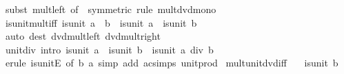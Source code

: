 \begin{isabellebody}
\ {\isacharparenleft}{\kern0pt}subst\ mult{\isacharunderscore}{\kern0pt}{}{\isacharunderscore}{\kern0pt}left\ {\isacharbrackleft}{\kern0pt}of\ {}{\isacharcomma}{\kern0pt}\ symmetric{\isacharbrackright}{\kern0pt}{\isacharparenright}{\kern0pt}\ {\isacharparenleft}{\kern0pt}rule\ mult{\isacharunderscore}{\kern0pt}dvd{\isacharunderscore}{\kern0pt}mono{\isacharparenright}{\kern0pt}%
\endisatagproof
{\isafoldproof}%
%
\isadelimproof
\isanewline
%
\endisadelimproof
\isanewline
{}\isamarkupfalse%
\ is{\isacharunderscore}{\kern0pt}unit{\isacharunderscore}{\kern0pt}mult{\isacharunderscore}{\kern0pt}iff{\isacharcolon}{\kern0pt}\ {\isachardoublequoteopen}is{\isacharunderscore}{\kern0pt}unit\ {\isacharparenleft}{\kern0pt}a\ {\isacharasterisk}{\kern0pt}\ b{\isacharparenright}{\kern0pt}\ {\isasymlongleftrightarrow}\ is{\isacharunderscore}{\kern0pt}unit\ a\ {\isasymand}\ is{\isacharunderscore}{\kern0pt}unit\ b{\isachardoublequoteclose}\isanewline
%
\isadelimproof
\ \ %
\endisadelimproof
%
\isatagproof
{}\isamarkupfalse%
\ {\isacharparenleft}{\kern0pt}auto\ dest{\isacharcolon}{\kern0pt}\ dvd{\isacharunderscore}{\kern0pt}mult{\isacharunderscore}{\kern0pt}left\ dvd{\isacharunderscore}{\kern0pt}mult{\isacharunderscore}{\kern0pt}right{\isacharparenright}{\kern0pt}%
\endisatagproof
{\isafoldproof}%
%
\isadelimproof
\isanewline
%
\endisadelimproof
\isanewline
{}\isamarkupfalse%
\ unit{\isacharunderscore}{\kern0pt}div\ {\isacharbrackleft}{\kern0pt}intro{\isacharbrackright}{\kern0pt}{\isacharcolon}{\kern0pt}\ {\isachardoublequoteopen}is{\isacharunderscore}{\kern0pt}unit\ a\ {\isasymLongrightarrow}\ is{\isacharunderscore}{\kern0pt}unit\ b\ {\isasymLongrightarrow}\ is{\isacharunderscore}{\kern0pt}unit\ {\isacharparenleft}{\kern0pt}a\ div\ b{\isacharparenright}{\kern0pt}{\isachardoublequoteclose}\isanewline
%
\isadelimproof
\ \ %
\endisadelimproof
%
\isatagproof
{}\isamarkupfalse%
\ {\isacharparenleft}{\kern0pt}erule\ is{\isacharunderscore}{\kern0pt}unitE\ {\isacharbrackleft}{\kern0pt}of\ b\ a{\isacharbrackright}{\kern0pt}{\isacharparenright}{\kern0pt}\ {\isacharparenleft}{\kern0pt}simp\ add{\isacharcolon}{\kern0pt}\ ac{\isacharunderscore}{\kern0pt}simps\ unit{\isacharunderscore}{\kern0pt}prod{\isacharparenright}{\kern0pt}%
\endisatagproof
{\isafoldproof}%
%
\isadelimproof
\isanewline
%
\endisadelimproof
\isanewline
{}\isamarkupfalse%
\ mult{\isacharunderscore}{\kern0pt}unit{\isacharunderscore}{\kern0pt}dvd{\isacharunderscore}{\kern0pt}iff{\isacharcolon}{\kern0pt}\isanewline
\ \ \ {\isachardoublequoteopen}is{\isacharunderscore}{\kern0pt}unit\ b{\isachardoublequoteclose}\isanewline

\end{isabellebody}
